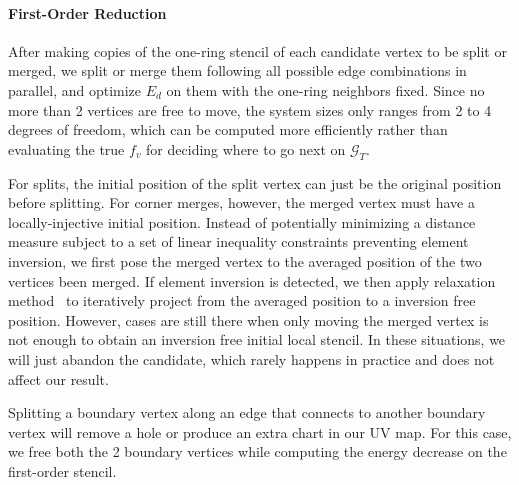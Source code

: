 \paragraph{First-Order Reduction}
After making copies of the one-ring stencil of each candidate vertex to be split or merged, we split or merge them following all possible edge combinations in parallel, and optimize $E_d$ on them with the one-ring neighbors fixed. Since no more than 2 vertices are free to move, the system sizes only ranges from 2 to 4 degrees of freedom, which can be computed more efficiently rather than evaluating the true $f_v$ for deciding where to go next on $\mathcal{G}_T$.

For splits, the initial position of the split vertex can just be the original position before splitting. For corner merges, however, the merged vertex must have a locally-injective initial position. Instead of potentially minimizing a distance measure subject to a set of linear inequality constraints preventing element inversion, we first pose the merged vertex to the averaged position of the two vertices been merged. If element inversion is detected, we then apply relaxation method~\cite{Agmon1954Relaxation} to iteratively project from the averaged position to a inversion free position. However, cases are still there when only moving the merged vertex is not enough to obtain an inversion free initial local stencil. In these situations, we will just abandon the candidate, which rarely happens in practice and does not affect our result.

Splitting a boundary vertex along an edge that connects to another boundary vertex will remove a hole or produce an extra chart in our UV map. For this case, we free both the 2 boundary vertices while computing the energy decrease on the first-order stencil. 